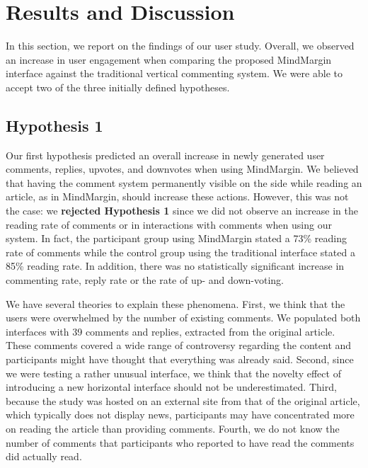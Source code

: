 \section{Results and Discussion}

In this section, we report on the findings of our user study. Overall, we observed an increase in user engagement when comparing the proposed MindMargin interface against the traditional vertical commenting system. We were able to accept two of the three initially defined hypotheses.

\subsection{Hypothesis 1}
Our first hypothesis predicted an overall increase in newly generated user comments, replies, upvotes, and downvotes when using MindMargin. We believed that having the comment system permanently visible on the side while reading an article, as in MindMargin, should increase these actions. However, this was not the case: we \textbf{rejected Hypothesis 1} since we did not observe an increase in the reading rate of comments or in interactions with comments when using our system. In fact, the participant group using MindMargin stated a 73\% reading rate of comments while the control group using the traditional interface stated a 85\% reading rate. In addition, there was no statistically significant increase in commenting rate, reply rate or the rate of up- and down-voting. 

We have several theories to explain these phenomena. First, we think that the users were overwhelmed by the number of existing comments. We populated both interfaces with 39 comments and replies, extracted from the original article. These comments covered a wide range of controversy regarding the content and participants might have thought that everything was already said. Second, since we were testing a rather unusual interface, we think that the novelty effect of introducing a new horizontal interface should not be underestimated. Third, because the study was hosted on an external site from that of the original article, which typically does not display news, participants may have concentrated more on reading the article than providing comments. Fourth, we do not know the number of comments that participants who reported to have read the comments did actually read.

